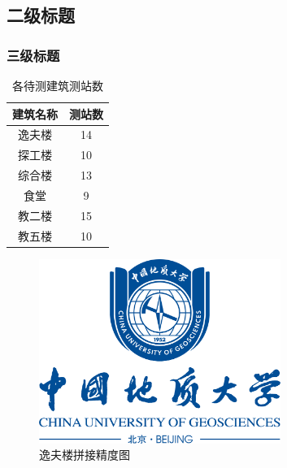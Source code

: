 \documentclass[12pt,a4paper]{article}
\begin{document}
\subsection{二级标题}

\subsubsection{三级标题}

\begin{table}[H]
    \centering
    \caption{\label{tab}各待测建筑测站数}
    \begin{tabular}{|c|c|}
        \hline
        建筑名称 & 测站数 \\
        \hline
        逸夫楼   & 14     \\
        \hline
        探工楼   & 10     \\
        \hline
        综合楼   & 13     \\
        \hline
        食堂     & 9      \\
        \hline
        教二楼   & 15     \\
        \hline
        教五楼   & 10     \\
        \hline
    \end{tabular}
\end{table}

\begin{figure}[H]
    \centering
    \includegraphics[width=0.7\textwidth]{校徽与中英文（蓝色中轴式）.png}
    \caption{\label{fig:yif_std}逸夫楼拼接精度图}
\end{figure}
\end{document}
